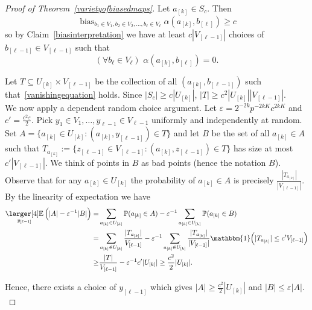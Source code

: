 \documentclass[a4paper,11pt]{article}
\theoremstyle{definition}
\newcommand\id{\mathbbm{1}}
\newcommand{\on}[1]{
	\operatorname{#1}
}
\newcommand{\exx}{
  \mathop{
    \mathchoice{\vcenter{\hbox{\larger[4]$\mathbb{E}$}}}
               {\kern0pt\mathbb{E}}
               {\kern0pt\mathbb{E}}
               {\kern0pt\mathbb{E}}
  }\displaylimits
}
\begin{document}
\begin{proof}[Proof of Theorem~\ref{varietyofbiasedmaps}]
Let $a_{[k]} \in S_c$. Then
\[\on{bias}_{b_1 \in V_1, b_2 \in V_2,\dots, b_\ell \in V_\ell} \alpha(a_{[k]},b_{[\ell]}) \geq c\]
so by Claim~\ref{biasinterpretation} we have at least $c|V_{[\ell-1]}|$ choices of $b_{[\ell-1]} \in V_{[\ell-1]}$ such that
\begin{equation}
    (\forall b_\ell \in V_\ell)\,\,\alpha(a_{[k]}, b_{[\ell]}) = 0.\label{vanishingequation}
\end{equation}

Let $T \subseteq U_{[k]} \times V_{[\ell-1]}$ be the collection of all $(a_{[k]}, b_{[\ell-1]})$ such that~\eqref{vanishingequation} holds. Since $|S_c| \geq c|U_{[k]}|$, $|T| \geq c^2 |U_{[k]}||V_{[\ell-1]}|$.\\

We now apply a dependent random choice argument. Let $\varepsilon = 2^{-2k}p^{-2k K} c^{2kK}$ and $c' = \frac{c^2 \varepsilon}{2}$. Pick $y_1 \in V_1, \dots, y_{\ell-1} \in V_{\ell-1}$ uniformly and independently at random. Set $A = \{a_{[k]} \in U_{[k]} : (a_{[k]}, y_{[\ell-1]}) \in T\}$ and let $B$ be the set of all $a_{[k]} \in A$ such that $T_{a_{[k]}} := \{z_{[\ell-1]} \in V_{[\ell-1]} : (a_{[k]}, z_{[\ell-1]}) \in T\}$ has size at most $c'|V_{[\ell-1]}|$. We think of points in $B$ as bad points (hence the notation $B$).\\
\indent Observe that for any $a_{[k]} \in U_{[k]}$ the probability of $a_{[k]} \in A$ is precisely $\frac{|T_{a_{[k]}}|}{|V_{[\ell-1]}|}$. By the linearity of expectation we have
\begin{align*}\exx_{y_{[\ell-1]}} \Big(|A| - \varepsilon^{-1}|B|\Big) = &\sum_{a_{[k]} \in U_{[k]}} \mathbb{P}(a_{[k]} \in A) - \varepsilon^{-1} \sum_{a_{[k]} \in U_{[k]}} \mathbb{P}(a_{[k]} \in B) \\
= &\sum_{a_{[k]} \in U_{[k]}} \frac{|T_{a_{[k]}}|}{V_{[\ell-1]}} - \varepsilon^{-1} \sum_{a_{[k]} \in U_{[k]}} \frac{|T_{a_{[k]}}|}{|V_{[\ell-1]}|} \id\Big(|T_{a_{[k]}}| \leq c' V_{[\ell-1]}\Big)\\
\geq & \frac{|T|}{V_{[\ell-1]}} - \varepsilon^{-1} c' |U_{[k]}| \geq \frac{c^2}{2}|U_{[k]}|.\end{align*}

Hence, there exists a choice of $y_{[\ell-1]}$ which gives $|A| \geq \frac{c^2}{2}|U_{[k]}|$ and $|B| \leq \varepsilon |A|$.\\


\end{proof}
\end{document}
